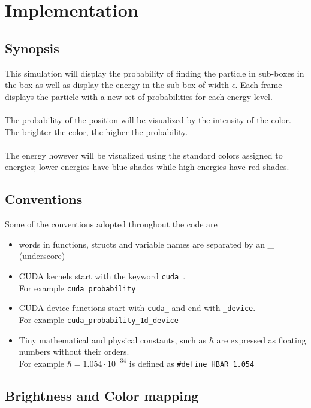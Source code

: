 \documentclass[a4paper, 10pt]{article}
\begin{document}
\newpage

\section{Implementation}
    \subsection{Synopsis} \label{sec:synopsis}
    This simulation will display the probability of finding the particle in sub-boxes in the box
    as well as display the energy in the sub-box of width $\epsilon$. Each frame displays the
    particle with a new set of probabilities for each energy level.\\\\
    The probability of the position will be visualized by the intensity of the color. The brighter
    the color, the higher the probability.\\\\
    The energy however will be visualized using the standard colors assigned to energies; lower
    energies have blue-shades while high energies have red-shades.

    \subsection{Conventions}
    Some of the conventions adopted throughout the code are
    \begin{itemize}
        \item words in functions, structs and variable names are separated by an \_ (underscore)
        \item CUDA kernels start with the keyword \texttt{cuda\_}.\\
              For example \texttt{cuda\_probability}
        \item CUDA device functions start with \texttt{cuda\_} and end with \texttt{\_device}.\\
              For example \texttt{cuda\_probability\_1d\_device}
        \item Tiny mathematical and physical constants, such as $\hbar$ are expressed
              as floating numbers without their orders.\\ For example $\hbar = 1.054\cdot10^{-34}$
              is defined as \texttt{\#define HBAR 1.054}
    \end{itemize}

    \subsection{Brightness and Color mapping}
\end{document}

